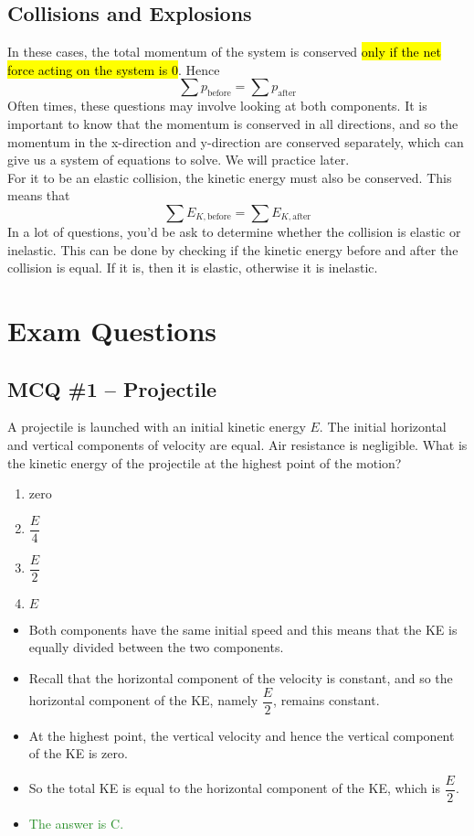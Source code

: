 \documentclass[a4paper,12pt]{article}
\let\oldsection\section
\renewcommand\section{\clearpage\oldsection}
\newcommand{\lb}{\\[8pt]}
\newcommand{\ans}[1]{\textcolor{ForestGreen}{The answer is #1.}}
\begin{document}
\pagebreak

\subsection{Collisions and Explosions}

In these cases, the total momentum of the system is conserved \hl{only if the net force acting on the system is 0}. Hence
$$\sum p_\text{before} = \sum p_{\text{after}}$$
Often times, these questions may involve looking at both components. It is important to know that the momentum is conserved in all directions, and so the momentum in the x-direction and y-direction are conserved separately, which can give us a system of equations to solve. We will practice later.\lb
For it to be an elastic collision, the kinetic energy must also be conserved. This means that
$$\sum E_{K, \text{before}} = \sum E_{K, \text{after}}$$
In a lot of questions, you'd be ask to determine whether the collision is elastic or inelastic. This can be done by checking if the kinetic energy before and after the collision is equal. If it is, then it is elastic, otherwise it is inelastic.\lb

\section{Exam Questions}

\subsection{MCQ \#1 -- Projectile}

A projectile is launched with an initial kinetic energy $E$. The initial horizontal and vertical components of velocity are equal. Air resistance is negligible.
What is the kinetic energy of the projectile at the highest point of the motion?

\begin{enumerate}[label=\Alph*.]
  \item zero
  \item $\dfrac{E}{4}$
  \item $\dfrac{E}{2}$
  \item $E$
\end{enumerate}

\begin{itemize}
  \item Both components have the same initial speed and this means that the KE is equally divided between the two components.
  \item Recall that the horizontal component of the velocity is constant, and so the horizontal component of the KE, namely $\dfrac{E}{2}$, remains constant.
  \item At the highest point, the vertical velocity and hence the vertical component of the KE is zero.
  \item So the total KE is equal to the horizontal component of the KE, which is $\dfrac{E}{2}$.
  \item \ans{C}
\end{itemize}
\end{document}
